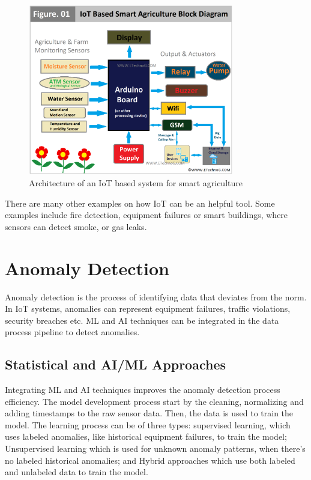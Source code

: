 \begin{figure}[H]
	\centering
	\includegraphics[width=0.8\textwidth, height=0.5\textheight, keepaspectratio]{Chapters/Figures/Monitoring/SmartAgricultureArchitecture.png}
	\caption{Architecture of an \gls{IoT} based system for smart agriculture\cite{hengko_smart_agriculture}}
	\label{fig:monitoring:smartagriculturearchitecture}
\end{figure}

There are many other examples on how \gls{IoT} can be an helpful tool. Some
examples include fire detection, equipment failures or  smart buildings, where
sensors can detect smoke, or gas leaks.

\section{Anomaly Detection}
Anomaly detection is the process of identifying data that deviates from the norm.
In \gls{IoT} systems, anomalies can represent equipment failures, traffic violations,
security breaches etc. \gls{ML} and \gls{AI} techniques
can be integrated in the data process pipeline to detect anomalies.


\subsection{Statistical and AI/ML Approaches}
Integrating \gls{ML} and \gls{AI} techniques improves the anomaly detection
process efficiency.
The model development process start by the cleaning, normalizing and adding
timestamps to the raw sensor data. Then, the data is used to train the model.
The learning process can be of three types: supervised learning, which uses
labeled anomalies, like historical equipment failures, to train the model;
Unsupervised learning which is used for unknown anomaly patterns, when there's
no labeled historical anomalies; and Hybrid approaches which use both labeled
and unlabeled data to train the model.

